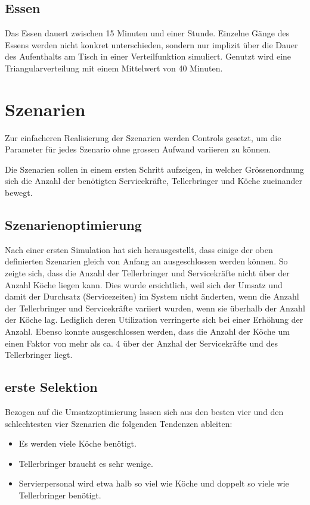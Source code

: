 \documentclass[ngerman,a4paper,12pt]{scrreprt}
\begin{document}
		\subsection{Essen}
			Das Essen dauert zwischen 15 Minuten und einer Stunde. Einzelne Gänge des Essens werden nicht konkret unterschieden, sondern nur implizit über die Dauer des Aufenthalts am Tisch in einer Verteilfunktion simuliert. Genutzt wird eine Triangularverteilung mit einem Mittelwert von 40 Minuten.\\
			
	\section{Szenarien}
		Zur einfacheren Realisierung der Szenarien werden Controls gesetzt, um die Parameter für jedes Szenario ohne grossen Aufwand variieren zu können.\\
		
		
		Die Szenarien sollen in einem ersten Schritt aufzeigen, in welcher Grössenordnung sich die Anzahl der benötigten Servicekräfte, Tellerbringer und Köche zueinander bewegt.
			
		\subsection{Szenarienoptimierung}
		Nach einer ersten Simulation hat sich herausgestellt, dass einige der oben definierten Szenarien gleich von Anfang an ausgeschlossen werden können. So zeigte sich, dass die Anzahl der Tellerbringer und Servicekräfte nicht über der Anzahl Köche liegen kann. Dies wurde ersichtlich, weil sich der Umsatz und damit der Durchsatz (Servicezeiten) im System nicht änderten, wenn die Anzahl der Tellerbringer und Servicekräfte variiert wurden, wenn sie überhalb der Anzahl der Köche lag. Lediglich deren Utilization verringerte sich bei einer Erhöhung der Anzahl.
		 Ebenso konnte ausgeschlossen werden, dass die Anzahl der Köche um einen Faktor von mehr als ca. 4 über der Anzhal der Servicekräfte und des Tellerbringer liegt.  
		
		\subsection{erste Selektion}
			Bezogen auf die Umsatzoptimierung lassen sich aus den besten vier und den schlechtesten vier Szenarien die folgenden Tendenzen ableiten:
			\begin{itemize}
				\item Es werden viele Köche benötigt. 
				\item Tellerbringer braucht es sehr wenige.
				\item Servierpersonal wird etwa halb so viel wie Köche und doppelt so viele wie Tellerbringer benötigt.
			\end{itemize}
		
\end{document}
